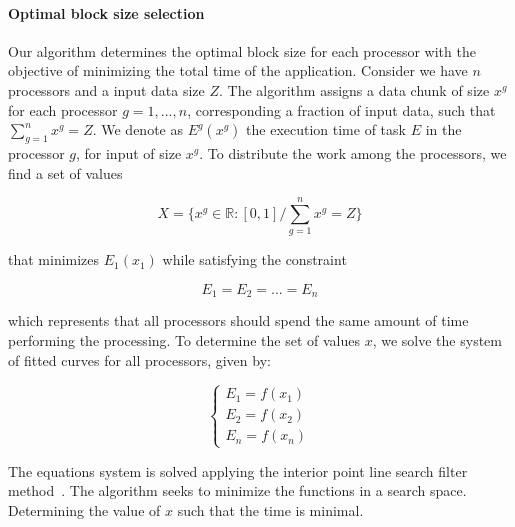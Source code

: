 \documentclass[journal]{IEEEtran}
\begin{document}
\vspace{0.2cm}
\paragraph*{Optimal block size selection} Our algorithm determines the optimal
block size for each processor with the objective of minimizing the total time of
the application. Consider we have $n$ processors and a input data size $Z$. The
algorithm assigns a data chunk of size $x^g$ for each processor $g=1,...,n$,
corresponding a fraction of input data, such that $\sum_{g=1}^n x^g = Z$. We
denote as $E^g(x^g)$ the execution time of task $E$ in the processor $g$, for
input of size $x^g$. To distribute the work among the processors, we find a set
of values
	
\begin{equation}
	X = \{ x^g \in \mathbb{R}:[0,1] / \sum_{g=1}^n x^g = Z \}
	\label{eq: totalResultado}
\end{equation}

that minimizes $E_1(x_1)$ while satisfying the constraint

\begin{equation}
	E_{1} = E_{2} = ...= E_{n}
	\label{eq: Restricao}
\end{equation}

which represents that all processors should spend the same amount of time
performing the processing. To determine the set of values $x$, we solve the
system of fitted curves for all processors, given by:

\begin{equation}
	\left\lbrace
	\begin{array}{ll}
		\displaystyle E_{1} = f(x_{1})  \\
		\displaystyle E_{2} = f(x_{2})   \\
		\displaystyle E_{n} = f(x_{n}) 
		\label{eq: system}
	\end{array}
	\right.
\end{equation}

The equations system is solved applying the interior point line search filter
method~\cite{point}. The algorithm seeks to minimize the functions in a search space. Determining the value of $x$ such that the time is minimal.


\vspace{0.2cm}
\end{document}
